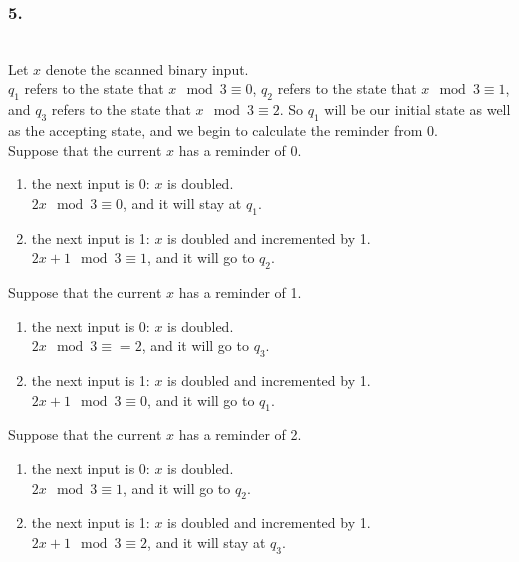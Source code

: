 \documentclass{article}
\begin{document}
	\subsubsection*{5.}
	\\
	Let $x$ denote the scanned binary input.\\
	$q_1$ refers to the state that $x \mod 3 \equiv 0$, $q_2$ refers to the state that  $x \mod 3 \equiv 1$, and $q_3$ refers to the state that  $x \mod 3 \equiv 2$. So $q_1$ will be our initial state as well as the accepting state, and we begin to calculate the reminder from 0.\\
	Suppose that the current $x$ has a reminder of 0.
	\begin{enumerate}
		\item the next input is 0: $x$ is doubled.\\ $2x \mod 3 \equiv 0$, and it will stay at $q_1$.
		\item the next input is 1: $x$ is doubled and incremented by 1.\\ $2x+1 \mod 3 \equiv 1$, and it will go to $q_2$.
	\end{enumerate}
Suppose that the current $x$ has a reminder of 1.
\begin{enumerate}
	\item the next input is 0: $x$ is doubled.\\
	$2x \mod 3 \equiv = 2$, and it will go to $q_3$.
	\item the next input is 1: $x$ is doubled and incremented by 1.\\
	$2x + 1 \mod 3  \equiv 0$, and it will go to $q_1$.
\end{enumerate}
Suppose that the current $x$ has a reminder of 2.
\begin{enumerate}
	\item the next input is 0: $x$ is doubled.\\
	$2x \mod 3 \equiv 1$, and it will go to $q_2$.
	\item the next input is 1: $x$ is doubled and incremented by 1.\\
	$2x + 1 \mod 3 \equiv 2$, and it will stay at $q_3$.
\end{enumerate}
\end{document}
